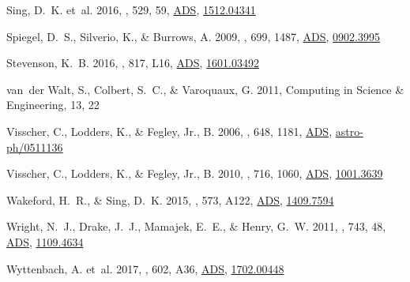 \documentclass[tighten, times, twocolumn]{aastex61}  %
\newcommand{\eprint}[1]{\href{http://arxiv.org/abs/#1}{#1}}
\renewcommand{\eprint}[1]{\href{http://arxiv.org/abs/#1}{#1}}
\providecommand{\adsurl}[1]{\href{#1}{ADS}}
\begin{document}
\begin{thebibliography}{50}
{Sing}, D.~K. {et~al.} 2016, \nat, 529, 59,
  \adsurl{http://adsabs.harvard.edu/abs/2016Natur.529...59S},
  \eprint{1512.04341}

{Spiegel}, D.~S., {Silverio}, K., \& {Burrows}, A. 2009, \apj, 699, 1487,
  \adsurl{http://adsabs.harvard.edu/abs/2009ApJ...699.1487S},
  \eprint{0902.3995}

{Stevenson}, K.~B. 2016, \apjl, 817, L16,
  \adsurl{http://adsabs.harvard.edu/abs/2016ApJ...817L..16S},
  \eprint{1601.03492}

van~der Walt, S., Colbert, S.~C., \& Varoquaux, G. 2011, Computing in Science
  \& Engineering, 13, 22

{Visscher}, C., {Lodders}, K., \& {Fegley}, Jr., B. 2006, \apj, 648, 1181,
  \adsurl{http://adsabs.harvard.edu/abs/2006ApJ...648.1181V},
  \eprint{astro-ph/0511136}

{Visscher}, C., {Lodders}, K., \& {Fegley}, Jr., B. 2010, \apj, 716, 1060,
  \adsurl{http://adsabs.harvard.edu/abs/2010ApJ...716.1060V},
  \eprint{1001.3639}

{Wakeford}, H.~R., \& {Sing}, D.~K. 2015, \aap, 573, A122,
  \adsurl{http://adsabs.harvard.edu/abs/2015A\%26A...573A.122W},
  \eprint{1409.7594}

{Wright}, N.~J., {Drake}, J.~J., {Mamajek}, E.~E., \& {Henry}, G.~W. 2011,
  \apj, 743, 48, \adsurl{http://adsabs.harvard.edu/abs/2011ApJ...743...48W},
  \eprint{1109.4634}

{Wyttenbach}, A. {et~al.} 2017, \aap, 602, A36,
  \adsurl{http://adsabs.harvard.edu/abs/2017A\%26A...602A..36W},
  \eprint{1702.00448}

\end{thebibliography}
\end{document}
